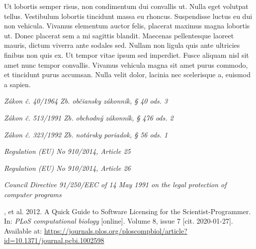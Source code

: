 \documentclass[thesismargins, english, thesislinespacing, twoside, openright, upjsfrontpage]{rnthesis}
\begin{document}
\zaver

Ut lobortis semper risus, non condimentum dui convallis ut. Nulla eget volutpat tellus. Vestibulum lobortis tincidunt massa eu rhoncus. Suspendisse luctus eu dui non vehicula. Vivamus elementum auctor felis, placerat maximus magna lobortis ut. Donec placerat sem a mi sagittis blandit. Maecenas pellentesque laoreet mauris, dictum viverra ante sodales sed. Nullam non ligula quis ante ultricies finibus non quis ex. Ut tempor vitae ipsum sed imperdiet. Fusce aliquam nisl sit amet nunc tempor convallis. Vivamus vehicula magna sit amet purus commodo, et tincidunt purus accumsan. Nulla velit dolor, lacinia nec scelerisque a, euismod a sapien.
%

\begin{thebibliography}{9}

  \emph{Zákon č. 40/1964 Zb. občiansky zákonník, § 40 ods. 3}

  \emph{Zákon č. 513/1991 Zb. obchodný zákonník, § 476 ods. 2}

  \emph{Zákon č. 323/1992 Zb. notársky poriadok, § 56 ods. 1}

  \emph{Regulation (EU) No 910/2014, Article 25}

  \emph{Regulation (EU) No 910/2014, Article 26}

  \emph{Council Directive 91/250/EEC of 14 May 1991 on the legal protection of computer programs}

  , et al. 2012. A Quick Guide to Software Licensing for the Scientist-Programmer. In: \emph{PLoS computational biology} [online]. Volume 8, issue 7 [cit. 2020-01-27]. Available at: \url{https://journals.plos.org/ploscompbiol/article?id=10.1371/journal.pcbi.1002598}


\end{thebibliography}
\end{document}
